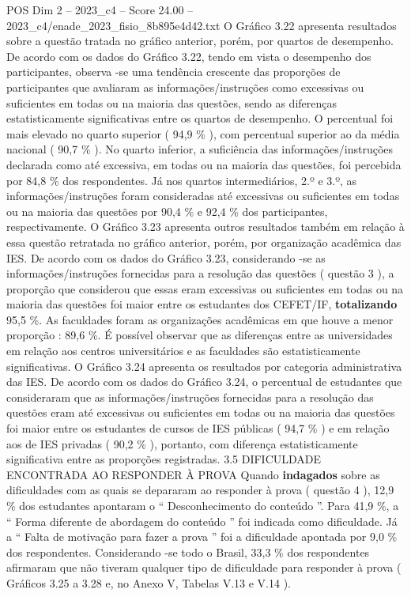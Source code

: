 \begin{textsample}{POS Dim 2 – 2023\_c4 – Score 24.00 – 2023\_c4/enade\_2023\_fisio\_8b895e4d42.txt}
O Gráfico 3.22 apresenta resultados sobre a questão tratada no gráfico anterior, porém, por quartos de desempenho.
De acordo com os dados do Gráfico 3.22, tendo em vista o desempenho dos participantes, observa -se uma tendência crescente das proporções de participantes que avaliaram as informações/instruções como excessivas ou suficientes em todas ou na maioria das questões, sendo as diferenças estatisticamente significativas entre os quartos de desempenho.
O percentual foi mais elevado no quarto superior ( 94,9 \% ), com percentual superior ao da média nacional ( 90,7 \% ).
No quarto inferior, a suficiência das informações/instruções declarada como até excessiva, em todas ou na maioria das questões, foi percebida por 84,8 \% dos respondentes.
Já nos quartos intermediários, 2.º e 3.º, as informações/instruções foram consideradas até excessivas ou suficientes em todas ou na maioria das questões por 90,4 \% e 92,4 \% dos participantes, respectivamente.
O Gráfico 3.23 apresenta outros resultados também em relação à essa questão retratada no gráfico anterior, porém, por organização acadêmica das IES.
De acordo com os dados do Gráfico 3.23, considerando -se as informações/instruções fornecidas para a resolução das questões ( questão 3 ), a proporção que considerou que essas eram excessivas ou suficientes em todas ou na maioria das questões foi maior entre os estudantes dos CEFET/IF, \textbf{totalizando} 95,5 \%.
As faculdades foram as organizações acadêmicas em que houve a menor proporção : 89,6 \%.
É possível observar que as diferenças entre as universidades em relação aos centros universitários e as faculdades são estatisticamente significativas.
O Gráfico 3.24 apresenta os resultados por categoria administrativa das IES.
De acordo com os dados do Gráfico 3.24, o percentual de estudantes que consideraram que as informações/instruções fornecidas para a resolução das questões eram até excessivas ou suficientes em todas ou na maioria das questões foi maior entre os estudantes de cursos de IES públicas ( 94,7 \% ) e em relação aos de IES privadas ( 90,2 \% ), portanto, com diferença estatisticamente significativa entre as proporções registradas. 3.5 DIFICULDADE ENCONTRADA AO RESPONDER À PROVA Quando \textbf{indagados} sobre as dificuldades com as quais se depararam ao responder à prova ( questão 4 ), 12,9 \% dos estudantes apontaram o “ Desconhecimento do conteúdo ”.
Para 41,9 \%, a “ Forma diferente de abordagem do conteúdo ” foi indicada como dificuldade.
Já a “ Falta de motivação para fazer a prova ” foi a dificuldade apontada por 9,0 \% dos respondentes.
Considerando -se todo o Brasil, 33,3 \% dos respondentes afirmaram que não tiveram qualquer tipo de dificuldade para responder à prova ( Gráficos 3.25 a 3.28 e, no Anexo V, Tabelas V.13 e V.14 ).

\end{textsample}
